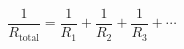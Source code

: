 \documentclass[12pt]{article}
\begin{document}
\[
\frac{1}{R_{\text{total}}} = \frac{1}{R_1} + \frac{1}{R_2} + \frac{1}{R_3} + \cdots
\]
\end{document}
